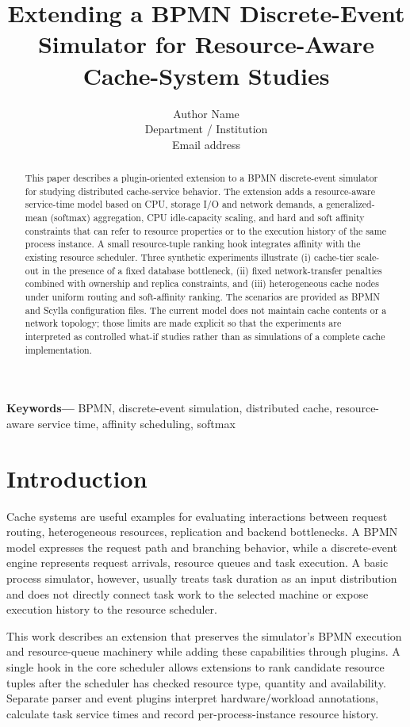 \documentclass[conference]{IEEEtran}
\title{Extending a BPMN Discrete-Event Simulator for Resource-Aware Cache-System Studies}
\author{Author Name\\Department / Institution\\Email address}
\begin{document}
\maketitle

\begin{abstract}
This paper describes a plugin-oriented extension to a BPMN discrete-event simulator for studying distributed
cache-service behavior. The extension adds a resource-aware service-time model based on CPU, storage I/O and network
demands, a generalized-mean (softmax) aggregation, CPU idle-capacity scaling, and hard and soft affinity constraints
that can refer to resource properties or to the execution history of the same process instance. A small resource-tuple
ranking hook integrates affinity with the existing resource scheduler. Three synthetic experiments illustrate (i)
cache-tier scale-out in the presence of a fixed database bottleneck, (ii) fixed network-transfer penalties combined
with ownership and replica constraints, and (iii) heterogeneous cache nodes under uniform routing and soft-affinity
ranking. The scenarios are provided as BPMN and Scylla configuration files. The current model does not maintain cache
contents or a network topology; those limits are made explicit so that the experiments are interpreted as controlled
what-if studies rather than as simulations of a complete cache implementation.
\end{abstract}

\noindent\textbf{Keywords---} BPMN, discrete-event simulation, distributed cache, resource-aware service time,
affinity scheduling, softmax

\section{Introduction}

Cache systems are useful examples for evaluating interactions between request routing, heterogeneous resources,
replication and backend bottlenecks. A BPMN model expresses the request path and branching behavior, while a
discrete-event engine represents request arrivals, resource queues and task execution. A basic process simulator,
however, usually treats task duration as an input distribution and does not directly connect task work to the selected
machine or expose execution history to the resource scheduler.

This work describes an extension that preserves the simulator's BPMN execution and resource-queue machinery while
adding these capabilities through plugins. A single hook in the core scheduler allows extensions to rank candidate
resource tuples after the scheduler has checked resource type, quantity and availability. Separate parser and event
plugins interpret hardware/workload annotations, calculate task service times and record per-process-instance
resource history.
\end{document}
